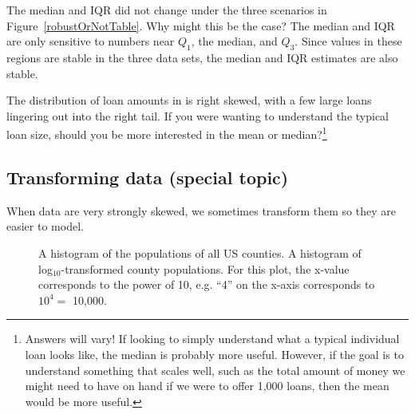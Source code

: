 \begin{example}{The median and IQR did not change under the
    three scenarios in Figure~\ref{robustOrNotTable}.
    Why might this be the case?}
  The median and IQR are only sensitive to numbers
  near $Q_1$, the median, and $Q_3$.
  Since values in these regions are stable in the three
  data sets, the median and IQR estimates are also stable.
\end{example}


\begin{exercise}
The distribution of loan amounts in 
is right skewed, with a few large loans lingering
out into the right tail.
If you were wanting to understand the typical loan size,
should you be more interested in the mean
or median?\footnote{Answers will vary!
  If looking to simply understand what a typical individual
  loan looks like, the median is probably more useful.
  However, if the goal is to understand something that
  scales well, such as the total amount of money we might
  need to have on hand if we were to offer 1,000 loans,
  then the mean would be more useful.}
\end{exercise}



\subsection{Transforming data (special topic)}
\label{transformingDataSubsection}

When data are very strongly skewed, we sometimes transform
them so they are easier to model.

\begin{figure}[ht]
  \centering
  \caption{ A histogram of
      the populations of all US counties.
       A histogram of
      log$_{10}$-transformed county populations.
      For this plot, the x-value corresponds to the power
      of 10, e.g. ``4'' on the x-axis corresponds to
      $10^4 =$ 10,000.}
    \label{county_pop_transformed}
\end{figure}

